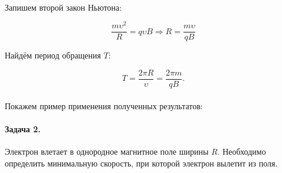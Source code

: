 \documentclass[dvipdfmx]{article}
\begin{document}
\paragraph{}

\noindent{}

Запишем второй закон Ньютона:

\begin{equation*}
  \frac{m\upsilon^2}{R} = q\upsilon B \Rightarrow R = \frac{m\upsilon}{qB}
\end{equation*}

Найдём период обращения $T$:

\begin{equation*}
  T = \frac{2\pi R}{\upsilon} = \frac{2\pi m}{qB}.
\end{equation*}
\paragraph{}

Покажем пример применения полученных результатов:

\paragraph{Задача 2.}

Электрон влетает в однородное магнитное поле ширины $R$. Необходимо определить минимальную скорость,
при которой электрон вылетит из поля.
\end{document}
